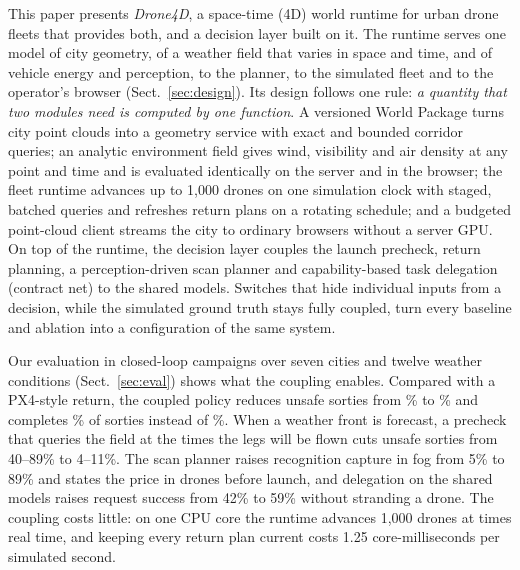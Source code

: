 This paper presents \emph{Drone4D}, a space-time (4D) world runtime for urban drone fleets that provides both, and a
decision layer built on it. The runtime serves one model of city geometry, of a weather field that varies in space and
time, and of vehicle energy and perception, to the planner, to the simulated fleet and to the operator's browser
(Sect.~\ref{sec:design}). Its design follows one rule: \emph{a quantity that two modules need is computed by one
function}. A versioned World Package turns city point clouds into a geometry service with exact and bounded corridor
queries; an analytic environment field gives wind, visibility and air density at any point and time and is evaluated
identically on the server and in the browser; the fleet runtime advances up to 1,000 drones on one simulation clock with
staged, batched queries and refreshes return plans on a rotating schedule; and a budgeted point-cloud client streams
the city to ordinary browsers without a server GPU. On top of the runtime, the decision layer couples the launch
precheck, return planning, a perception-driven scan planner and capability-based task delegation (contract net) to the
shared models. Switches that hide individual inputs from a decision, while the simulated ground truth stays fully
coupled, turn every baseline and ablation into a configuration of the same system.

Our evaluation in closed-loop campaigns over seven cities and twelve weather conditions (Sect.~\ref{sec:eval}) shows
what the coupling enables. Compared with a PX4-style return, the coupled policy reduces unsafe sorties from
\PXUNSAFE\% to \CPUNSAFE\% and completes \CPDONE\% of sorties instead of \PXDONE\%. When a weather front is forecast, a
precheck that queries the field at the times the legs will be flown cuts unsafe sorties from 40--89\% to 4--11\%. The
scan planner raises recognition capture in fog from 5\% to 89\% and states the price in drones before launch, and
delegation on the shared models raises request success from 42\% to 59\% without stranding a drone. The coupling
costs little: on one CPU core the runtime advances 1,000 drones at \STAGERTF{} times real time, and keeping every return
plan current costs 1.25 core-milliseconds per simulated second.


